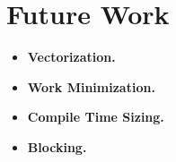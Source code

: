 \section{Future Work}\label{sec:future}

\begin{itemize}
  \item \textbf{Vectorization.}

  \item \textbf{Work Minimization.}

  \item \textbf{Compile Time Sizing.}

  \item \textbf{Blocking.}

\end{itemize}
